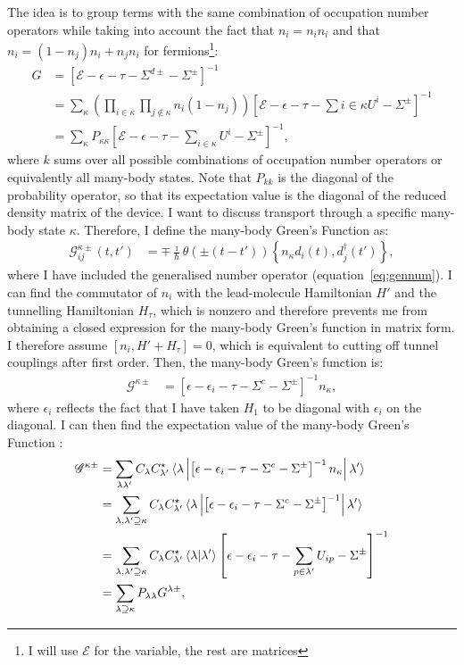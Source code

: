 The idea is to group terms with the same combination of occupation number operators while taking into account the fact that $n_i = n_i n_i$ and that $n_i = (1-n_j)n_i + n_j n_i$  for fermions\footnote{I will use $\mathscr{E}$ for the variable, the rest are matrices}:
\begin{align}
G &= \left[ \mathscr{E} - \epsilon - \tau -\Sigma^{d\pm} - \Sigma^\pm \right]^{-1} \nonumber\\
&= \sum_\kappa \left( \prod_{i\in\kappa} \prod_{j\notin\kappa} n_i (1-n_j) \right) \left[ \mathscr{E} - \epsilon -\tau - \sum{i \in \kappa}U^i - \Sigma^\pm \right]^{-1} \nonumber\\
&= \sum_\kappa P_{\kappa\kappa} \left[ \mathscr{E} - \epsilon - \tau - \sum_{i\in\kappa} U^i - \Sigma^\pm \right]^{-1} \label{eq:grouping},
\end{align}
where $k$ sums over all possible combinations of occupation number operators or equivalently all many-body states. Note that $P_{kk}$ is the diagonal of the probability operator, so that its expectation value is the diagonal of the reduced density matrix of the device. I want to discuss transport through a specific many-body state $\kappa$. Therefore, I define the many-body Green's Function as:
\begin{align}
\mathscr{G}^{\kappa\pm}_{ij} (t,t') &= \mp \frac{\imath}{\hbar} \theta(\pm(t-t'))\left\{ n_\kappa d_i(t), d_j^\dagger (t')\right\},
\label{eq:mbgfdef}
\end{align}
where I have included the generalised number operator (equation~\ref{eq:gennum}). I can find the commutator of $n_i$ with the lead-molecule Hamiltonian $H'$ and the tunnelling Hamiltonian $H_\tau$, which is nonzero and therefore prevents me from obtaining a closed expression for the many-body Green's function in matrix form. I therefore assume $\left[ n_i, H' + H_\tau \right]=0$, which is equivalent to cutting off tunnel couplings after first order. Then, the many-body Green's function is:
\begin{align}
\mathscr{G}^{\kappa\pm} &= \left[ \epsilon - \epsilon_i - \tau - \Sigma^c - \Sigma^\pm\right]^{-1} n_\kappa,
\label{eq:mbgfmatrix}
\end{align}
where $\epsilon_i$ reflects the fact that I have taken $H_1$ to be diagonal with $\epsilon_i$ on the diagonal. I can then find the expectation value of the many-body Green's Function :
\begin{align}
\mathscr{G}^{\kappa\pm} &= \sum_{\lambda\lambda'} C_\lambda C^\star_{\lambda'} \braket{\lambda \left| \left[ \epsilon - \epsilon_i - \tau - \Sigma^c - \Sigma^\pm\right]^{-1} n_\kappa \right| \lambda'} \nonumber \\
&= \sum_{\lambda,\lambda'\supseteq\kappa} C_\lambda C^\star_{\lambda'} \braket{\lambda \left| \left[ \epsilon - \epsilon_i - \tau - \Sigma^c - \Sigma^\pm\right]^{-1} \right| \lambda'} \nonumber \\
&= \sum_{\lambda,\lambda'\supseteq\kappa}  C_\lambda C^\star_{\lambda'} \braket{\lambda|\lambda'}  \left[ \epsilon - \epsilon_i - \tau - \sum_{p \in \lambda'} U_{ip} - \Sigma^\pm\right]^{-1}
\\&= \sum_{\lambda\supseteq\kappa} P_{\lambda\lambda} G^{\lambda\pm},\label{eq:mbgfresult}
\end{align}
